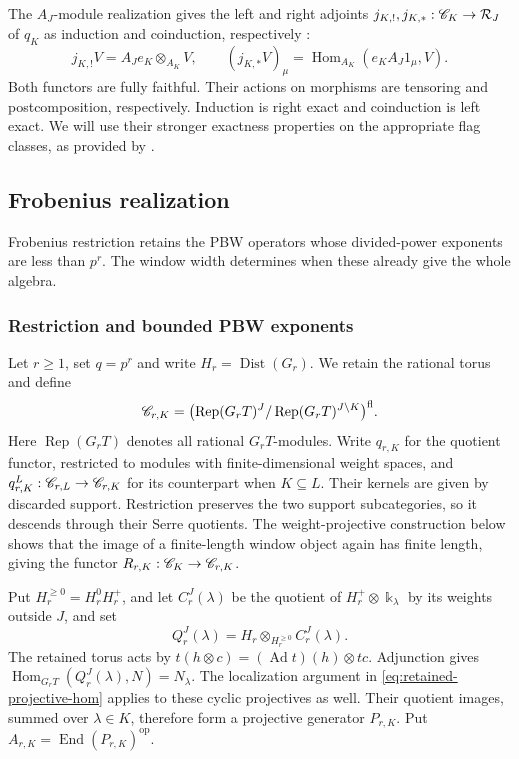 \documentclass[11pt,reqno]{amsart}
\newcommand{\kk}{\Bbbk}\newcommand{\ZZ}{\mathbb Z}\newcommand{\NN}{\mathbb N}
\newcommand{\Hom}{\operatorname{Hom}}\newcommand{\End}{\operatorname{End}}\newcommand{\Ext}{\operatorname{Ext}}
\newcommand{\Dist}{\operatorname{Dist}}\newcommand{\Ind}{\operatorname{Ind}}\newcommand{\Perf}{\operatorname{Perf}}
\newcommand{\fl}{\mathrm{fl}}\newcommand{\pf}{\mathrm{pf}}\newcommand{\op}{\mathrm{op}}\newcommand{\wt}{\mathrm{wt}}
\theoremstyle{definition}
\theoremstyle{remark}
\numberwithin{equation}{section}
\begin{document}
The $A_J$-module realization gives the left and right adjoints
$j_{K,!},j_{K,*}:\mathscr C_K\to\mathcal R_J$ of $q_K$ as induction and
coinduction, respectively \cite[Section~2.5]{BS}:
\begin{equation}\label{eq:window-adjoints}
 j_{K,!}V=A_Je_K\otimes_{A_K}V,
 \qquad
 (j_{K,*}V)_\mu=\Hom_{A_K}(e_KA_J1_\mu,V).
\end{equation}
Both functors are fully faithful. Their actions on morphisms
are tensoring and postcomposition, respectively. Induction is right
exact and coinduction is left exact. We will use their stronger
exactness properties on the appropriate flag classes, as provided
by \cite[Theorem~3.42]{BS}.

\subsection{Frobenius realization}\label{sec:frobenius}

Frobenius restriction retains the PBW operators whose divided-power
exponents are less than $p^r$. The window width determines when these
already give the whole algebra.

\subsubsection{Restriction and bounded PBW exponents}
Let $r\geq1$, set $q=p^r$ and write $H_r=\Dist(G_r)$. We retain
the rational torus and define
\[
 \CC_{r,K}=
 \bigl(\operatorname{Rep}(G_rT)^J/
       \operatorname{Rep}(G_rT)^{J\setminus K}\bigr)^{\fl}.
\]
Here $\operatorname{Rep}(G_rT)$ denotes all rational $G_rT$-modules.
Write $q_{r,K}$ for the quotient functor, restricted to modules with
finite-dimensional weight spaces, and
$q_{r,K}^L:\mathscr C_{r,L}\to\mathscr C_{r,K}$ for its counterpart when
$K\subseteq L$. Their kernels are given by discarded support.
Restriction preserves the two support subcategories, so
it descends through their Serre quotients. The weight-projective
construction below shows that the image of a finite-length window
object again has finite length, giving the functor
$R_{r,K}:\mathscr C_K\to\mathscr C_{r,K}$.

Put $H_r^{\geq0}=H_r^0H_r^+$, and let $C_r^J(\lambda)$ be the quotient of
$H_r^+\otimes\kk_\lambda$ by its weights outside $J$, and set
\[
 Q_r^J(\lambda)=H_r\otimes_{H_r^{\geq0}}C_r^J(\lambda).
\]
The retained torus acts by
$t(h\otimes c)=(\operatorname{Ad}t)(h)\otimes tc$.
Adjunction gives
$\Hom_{G_rT}(Q_r^J(\lambda),N)=N_\lambda$.
The localization argument in
\eqref{eq:retained-projective-hom} applies to these cyclic
projectives as well. Their quotient images, summed over
$\lambda\in K$, therefore form a projective generator
$P_{r,K}$. Put
$A_{r,K}=\End(P_{r,K})^{\op}$.
\end{document}
